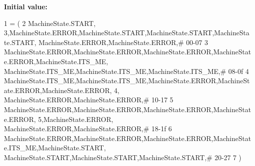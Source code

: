 {\bfseries Initial value\+:}
\begin{DoxyCode}
1 =  (
2 MachineState.START,     3,MachineState.ERROR,MachineState.START,MachineState.START,MachineState.START,
      MachineState.ERROR,MachineState.ERROR,\textcolor{comment}{# 00-07}
3 MachineState.ERROR,MachineState.ERROR,MachineState.ERROR,MachineState.ERROR,MachineState.ITS\_ME,
      MachineState.ITS\_ME,MachineState.ITS\_ME,MachineState.ITS\_ME,\textcolor{comment}{# 08-0f}
4 MachineState.ITS\_ME,MachineState.ITS\_ME,MachineState.ERROR,MachineState.ERROR,MachineState.ERROR,     4,
      MachineState.ERROR,MachineState.ERROR,\textcolor{comment}{# 10-17}
5 MachineState.ERROR,MachineState.ERROR,MachineState.ERROR,MachineState.ERROR,     5,MachineState.ERROR,
      MachineState.ERROR,MachineState.ERROR,\textcolor{comment}{# 18-1f}
6 MachineState.ERROR,MachineState.ERROR,MachineState.ERROR,MachineState.ITS\_ME,MachineState.START,
      MachineState.START,MachineState.START,MachineState.START,\textcolor{comment}{# 20-27}
7 )
\end{DoxyCode}
